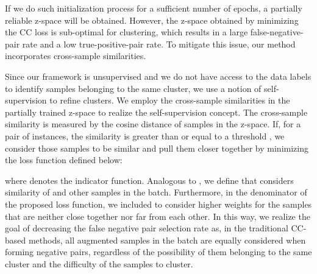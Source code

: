 \documentclass{bmvc2k}
\newcommand{\shadow}[1]{}
\def\s{\shadow}
\begin{document}
\s{If we show the -th column of  by , we can consider the representation of the second augmentation  as its positive pair while leaving the other  columns as negative. Then, similar to the instance-level loss, we define a contrastive loss function to pull the positive pair and push it away from the negatives as follows:}

\s{}

\s{Minimizing the above loss can lead to the trivial solution of mapping most data points to the same cluster. To avoid this, CC minimizes the negative entropy of cluster assignment probabilities defined below in Eq. (\ref{entropy}) where .}
\s{}


\s{The final cluster-level contrastive loss is calculated as:}

\s{
}

\s{The final loss of CC is the sum of the instance-level and cluster-level loss:}
\s{}


\s{As the first step in our method, we initialize our networks by training them to minimize the CC loss. }If we do such initialization process for a sufficient number of epochs, a partially reliable z-space will be obtained. However, the z-space obtained by minimizing the CC loss is sub-optimal for clustering, which results in a large false-negative-pair rate and a low true-positive-pair rate. To mitigate this issue, our method incorporates cross-sample similarities.  \s{REFRE TO THE ISSUE of FPPR and FNPR and that we use cross sample similarities to mitigate the issue and hen the next paragraph that it is unsupervised so we have to use a notion of self-supervision in refining positive and negative pairs... .... the cross-sample relationships in its training phase.}

Since our framework is unsupervised and we do not have access to the data labels to identify samples belonging to the same cluster, we use a notion of self-supervision to refine clusters. We employ the cross-sample similarities in the partially trained z-space to realize the self-supervision concept. The cross-sample similarity is measured by the cosine distance of samples in the z-space. If, for a pair of instances, the similarity is greater than or equal to a threshold , we consider those samples to be similar and pull them closer together by minimizing the loss function  defined below:
{\small
}
\s{}
{\small
}
where  denotes the indicator function.\s{Note that since s are normalized, .} Analogous to , we define  that considers similarity of  and other samples in the batch.
Furthermore, in the denominator of the proposed loss function, we included  to consider higher weights for the samples that are neither close together nor far from each other. In this way, we realize the goal of decreasing the false negative pair selection rate as, in the traditional CC-based methods, all augmented samples in the batch are equally considered when forming negative pairs, regardless of the possibility of them belonging to the same cluster and the difficulty of the samples to cluster.
\end{document}
